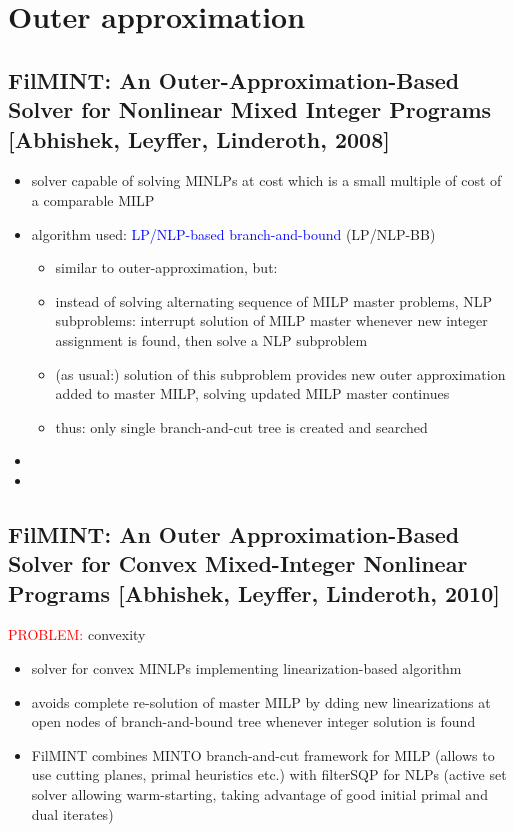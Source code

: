 \documentclass{article}
\begin{document}
\section{Outer approximation}
\subsection{FilMINT: An Outer-Approximation-Based Solver for Nonlinear Mixed Integer Programs [Abhishek, Leyffer, Linderoth, 2008]}
\begin{itemize}
\item solver capable of solving MINLPs at cost which is a small multiple of cost of a comparable MILP
\item algorithm used: \textcolor{blue}{LP/NLP-based branch-and-bound} (LP/NLP-BB) \cite{quesada1992lp}
\begin{itemize}
\item similar to outer-approximation, but:
\item instead of solving alternating sequence of MILP master problems, NLP subproblems: interrupt solution of MILP master whenever new integer assignment is found, then solve a NLP subproblem
\item (as usual:) solution of this subproblem provides new outer approximation added to master MILP, solving updated MILP master continues
\item thus: only single branch-and-cut tree is created and searched
\end{itemize}
\item 
\item 
\end{itemize}
\subsection{FilMINT: An Outer Approximation-Based Solver for Convex Mixed-Integer Nonlinear Programs [Abhishek, Leyffer, Linderoth, 2010]}
\textcolor{red}{PROBLEM:} convexity
\begin{itemize}
\item solver for convex MINLPs implementing linearization-based algorithm
\item avoids complete re-solution of master MILP by dding new linearizations at open nodes of branch-and-bound tree whenever integer solution is found
\item FilMINT combines MINTO branch-and-cut framework for MILP (allows to use cutting planes, primal heuristics etc.)  with filterSQP for NLPs (active set solver allowing warm-starting, taking advantage of good initial primal and dual iterates)
\end{itemize}
\newpage
\end{document}
